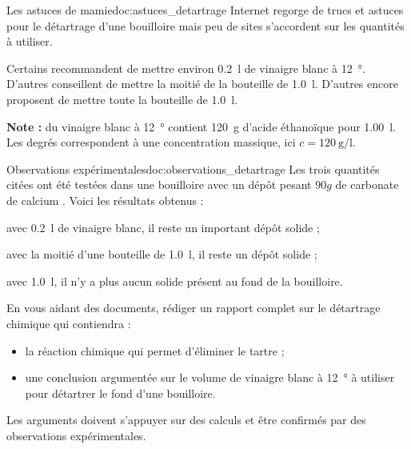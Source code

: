 \begin{doc}{Les astuces de mamie}{doc:astuces_detartrage}
  Internet regorge de trucs et astuces pour le détartrage d'une bouilloire mais peu de sites s'accordent sur les quantités à utiliser.

  Certains recommandent de mettre environ \qty{0,2}{\litre} de vinaigre blanc à \qty{12}{\degree}.
  D'autres conseillent de mettre la moitié de la bouteille de \qty{1,0}{\litre}.
  D'autres encore proposent de mettre toute la bouteille de \qty{1,0}{\litre}.
  
  \textbf{Note :} du vinaigre blanc à \qty{12}{\degree} contient \qty{120}{\g} d'acide éthanoïque pour \qty{1,00}{\litre}.
  Les degrés correspondent à une concentration massique, ici $c = \qty{120}{\g\per\litre}$.
\end{doc}

\begin{doc}{Observations expérimentales}{doc:observations_detartrage}
  Les trois quantités citées ont été testées dans une bouilloire avec un dépôt pesant $90 \unit{g}$ de carbonate de calcium .
  Voici les résultats obtenus :
  \begin{listePoints}
    \item avec \qty{0,2}{\litre} de vinaigre blanc, il reste un important dépôt solide ;
    \item avec la moitié d'une bouteille de \qty{1,0}{\litre}, il reste un dépôt solide ;
    \item avec \qty{1,0}{\litre}, il n'y a plus aucun solide présent au fond de la bouilloire.
  \end{listePoints}
\end{doc}


%
\numeroQuestion
En vous aidant des documents, rédiger un rapport complet sur le détartrage chimique qui contiendra :
\begin{itemize}
  \item la réaction chimique qui permet d'éliminer le tartre ;
  \item une conclusion argumentée sur le volume de vinaigre blanc à \qty{12}{\degree} à utiliser pour détartrer le fond d'une bouilloire.
\end{itemize}
Les arguments doivent s'appuyer sur des calculs et être confirmés par des observations expérimentales.


% 
